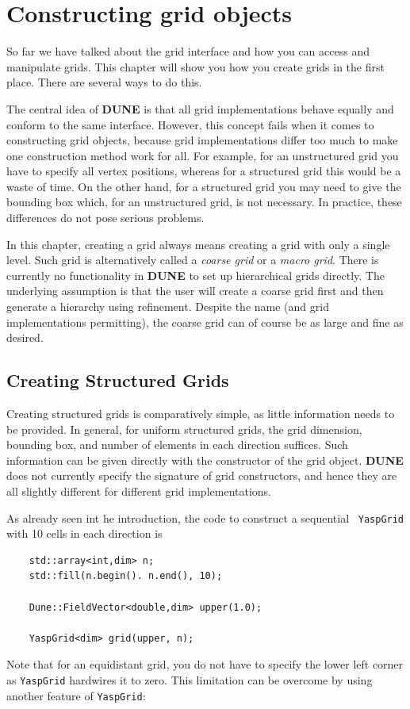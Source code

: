 \documentclass[11pt,a4paper,headinclude,footinclude,DIV16,headings=normal]{scrreprt}
\newcommand{\Dune}{{\sffamily\bfseries DUNE}\xspace}
\begin{document}
\chapter{Constructing grid objects}

So far we have talked about the grid interface and how you can access and
manipulate grids.  This chapter will show you how you create grids in the
first place.  There are several ways to do this.

The central idea of \Dune is that all grid implementations behave equally
and conform to the same interface.  However, this concept fails when it
comes to constructing grid objects, because grid implementations differ too
much to make one construction method work for all.  For example, for an
unstructured grid you have to specify all vertex positions, whereas for a
structured grid this would be a waste of time.  On the other hand, for
a structured grid you may need to give the bounding box which, for an
unstructured grid, is not necessary.  In practice, these differences do
not pose serious problems.

In this chapter, creating a grid always means creating a grid with only
a single level.  Such grid is alternatively called a {\em coarse grid}
or a {\em macro grid}.  There is currently no functionality in \Dune to
set up hierarchical grids directly.  The underlying assumption is that
the user will create a coarse grid first and then generate a hierarchy
using refinement.  Despite the name (and grid implementations permitting),
the coarse grid can of course be as large and fine as desired.

\section{Creating Structured Grids}

Creating structured grids is comparatively simple, as little information
needs to be provided.  In general, for uniform structured grids, the grid
dimension, bounding box, and number of elements in each direction suffices.
Such information can be given directly with the constructor of the grid
object. \Dune does not currently specify the signature of grid constructors,
and hence they are all slightly different for different grid implementations.

As already seen int he introduction, the code to construct a sequential \
\lstinline!YaspGrid! with 10 cells in each direction is
\begin{lstlisting}
    std::array<int,dim> n;
    std::fill(n.begin(). n.end(), 10);

    Dune::FieldVector<double,dim> upper(1.0);

    YaspGrid<dim> grid(upper, n);
\end{lstlisting}
Note that for an equidistant grid, you do not have to specify the lower left
corner as \lstinline!YaspGrid! hardwires it to zero. This limitation can be
overcome by using another feature of \lstinline!YaspGrid!:
\end{document}
